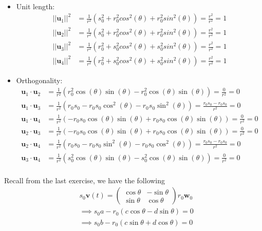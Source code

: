 \documentclass[12pt]{article}
\begin{document}
\begin{itemize}
    \item Unit length:
          \begin{align*}
              ||\mathbf{u}_1||^2 & = \frac{1}{r^2}(s_0^2 + r_0^2cos^2(\theta) + r_0^2sin^2(\theta)) = \frac{r^2}{r^2} = 1 \\
              ||\mathbf{u}_2||^2 & = \frac{1}{r^2}(s_0^2 + r_0^2cos^2(\theta) + r_0^2sin^2(\theta)) = \frac{r^2}{r^2} = 1 \\
              ||\mathbf{u}_3||^2 & = \frac{1}{r^2}(r_0^2+s_0^2cos^2(\theta)+s_0^2sin^2(\theta)) = \frac{r^2}{r^2} = 1     \\
              ||\mathbf{u}_4||^2 & = \frac{1}{r^2}(r_0^2+s_0^2cos^2(\theta)+s_0^2sin^2(\theta)) = \frac{r^2}{r^2} = 1
          \end{align*}

    \item Orthogonality:
          \begin{align*}
              \mathbf{u}_1 \cdot{\mathbf{u}_2} & = \frac{1}{r^2}(r_0^2 \cos(\theta) \sin(\theta) - r_0^2 \cos(\theta) \sin(\theta)) = \frac{0}{r^2} = 0    \\
              \mathbf{u}_1 \cdot{\mathbf{u}_3} & = \frac{1}{r^2}(r_0s_0 - r_0s_0\cos^2(\theta) - r_0s_0 \sin^2(\theta)) = \frac{r_0s_0-r_0s_0}{r^2} = 0    \\
              \mathbf{u}_1 \cdot{\mathbf{u}_4} & = \frac{1}{r^2}(-r_0s_0 \cos(\theta) \sin(\theta) + r_0s_0 \cos(\theta) \sin(\theta)) = \frac{0}{r^2} = 0 \\
              \mathbf{u}_2 \cdot{\mathbf{u}_3} & = \frac{1}{r^2}(-r_0s_0 \cos(\theta) \sin(\theta) + r_0s_0 \cos(\theta) \sin(\theta)) = \frac{0}{r^2} = 0 \\
              \mathbf{u}_2 \cdot{\mathbf{u}_4} & = \frac{1}{r^2}(r_0s_0 - r_0s_0 \sin^2(\theta) - r_0s_0 \cos^2(\theta)) = \frac{r_0s_0-r_0s_0}{r^2} = 0   \\
              \mathbf{u}_3 \cdot{\mathbf{u}_4} & = \frac{1}{r^2}(s_0^2 \cos(\theta) \sin(\theta) - s_0^2 \cos(\theta) \sin(\theta)) = \frac{0}{r^2} = 0    \\
          \end{align*}
\end{itemize}

Recall from the last exercise, we have the following
\begin{align*}
     & s_0\mathbf{v}(t) = \begin{pmatrix} \cos\theta & -\sin\theta \\ \sin\theta & \cos\theta\end{pmatrix} r_0\mathbf{w}_0 \\
     & \implies{} s_0a - r_0(c\cos\theta - d\sin\theta) = 0 \tag{1}                                                        \\
     & \implies{} s_0b - r_0(c\sin\theta + d\cos\theta) = 0  \tag{2}
\end{align*}
\end{document}
